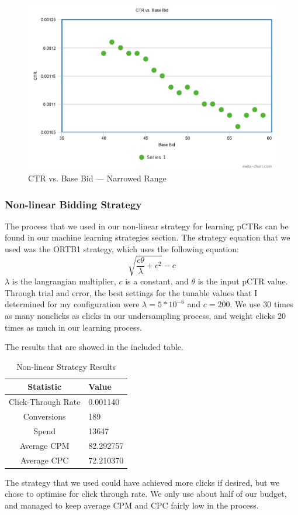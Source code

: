 \documentclass{sig-alternate-05-2015}
\begin{document}
\begin{figure}[h!]
  \includegraphics[width=\linewidth]{linear_CTR_specific.png}
  \caption{CTR vs. Base Bid --- Narrowed Range}
  \label{ctrbbs}
\end{figure}

\subsubsection{Non-linear Bidding Strategy}

The process that we used in our non-linear strategy for learning pCTRs can be found in our machine learning strategies section. The strategy equation that we used was the ORTB1 strategy\cite{ORTB}, which uses the following equation:
\begin{equation}\sqrt{\frac{c\theta}{\lambda}+c^2}-c\end{equation}
$\lambda$ is the langrangian multiplier, $c$ is a constant, and $\theta$ is
the input pCTR value. Through trial and error, the best settings for the
tunable values that I determined for my configuration were $\lambda=5*10^{-6}$ and
$c=200$. We use 30 times as many nonclicks as clicks in our undersampling process,
and weight clicks 20 times as much in our learning process.

The results that are showed in the included table.
\begin{table}[h!]
\centering
\caption{Non-linear Strategy Results}
\begin{tabular}{|c|l|} \hline
\textbf{Statistic}&\textbf{Value}\\ \hline
Click-Through Rate&0.001140\\ \hline
Conversions&189\\ \hline
Spend&13647\\ \hline
Average CPM&82.292757\\ \hline
Average CPC&72.210370\\
\hline\end{tabular}
\end{table}
The strategy that we used could have achieved more clicks if desired, but we chose to optimise for click through rate. We only
use about half of our budget, and managed to keep average CPM and CPC fairly low in the process.
\end{document}
